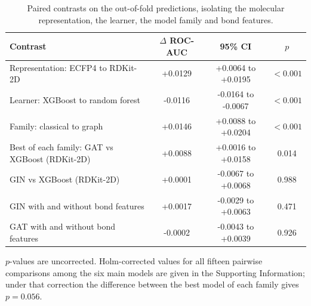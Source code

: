 \begin{table}[htbp]
\centering
\caption{Paired contrasts on the out-of-fold predictions, isolating the molecular representation, the learner, the model family and bond features.}
\label{tab:contrasts}
\small
\setlength{\tabcolsep}{4pt}
\begin{tabular}{lccc}
\toprule
Contrast & $\Delta$ ROC-AUC & 95\% CI & $p$ \\
\midrule
Representation: ECFP4 to RDKit-2D & +0.0129 & +0.0064 to +0.0195 & $<0.001$ \\
Learner: XGBoost to random forest & -0.0116 & -0.0164 to -0.0067 & $<0.001$ \\
Family: classical to graph & +0.0146 & +0.0088 to +0.0204 & $<0.001$ \\
Best of each family: GAT vs XGBoost (RDKit-2D) & +0.0088 & +0.0016 to +0.0158 & 0.014 \\
GIN vs XGBoost (RDKit-2D) & +0.0001 & -0.0067 to +0.0068 & 0.988 \\
GIN with and without bond features & +0.0017 & -0.0029 to +0.0063 & 0.471 \\
GAT with and without bond features & -0.0002 & -0.0043 to +0.0039 & 0.926 \\
\bottomrule
\end{tabular}
\begin{flushleft}\footnotesize $p$-values are uncorrected. Holm-corrected values for all fifteen pairwise comparisons among the six main models are given in the Supporting Information; under that correction the difference between the best model of each family gives $p = 0.056$.\end{flushleft}
\end{table}
